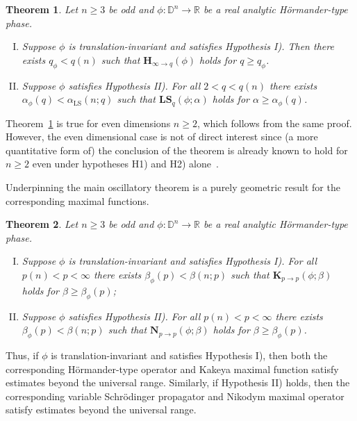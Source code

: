 \documentclass[reqno]{amsart}
\numberwithin{equation}{section}
\newcommand{\D}{\mathbb{D}}
\newcommand{\R}{\mathbb{R}}
\newcommand{\bH}{\mathbf{H}}
\newcommand{\bK}{\mathbf{K}}
\newcommand{\bN}{\mathbf{N}}
\newcommand{\bLS}{\mathbf{LS}}
\theoremstyle{plain}
\newtheorem{theorem}{Theorem}[section]
\theoremstyle{definition}
\begin{document}
\begin{theorem}\label{thm: osc improve}  Let $n \geq 3$ be odd and $\phi \colon \D^n \to \R$ be a real analytic H\"ormander-type phase. 
\begin{enumerate}[I)]
    \item Suppose $\phi$ is translation-invariant and satisfies Hypothesis I). Then there exists $q_{\phi} < q(n)$ such that $\bH_{\infty \to q}(\phi)$ holds for $q \geq q_{\phi}$.
    \item Suppose $\phi$ satisfies Hypothesis II). For all $2 < q < q(n)$ there exists $\alpha_{\phi}(q) < \alpha_{\mathrm{LS}}(n;q)$ such that $\bLS_q(\phi; \alpha)$ holds for $\alpha \geq \alpha_{\phi}(q)$. 
\end{enumerate}
\end{theorem}

Theorem~\ref{thm: osc improve} is true for even dimensions $n \geq 2$, which follows from the same proof. However, the even dimensional case is not of direct interest since (a more quantitative form of) the conclusion of the theorem is already known to hold for $n \geq 2$ even under hypotheses H1) and H2) alone~\cite{BG2011}. 


 Underpinning the main oscillatory theorem is a purely geometric result for the corresponding maximal functions. 

\begin{theorem}\label{thm: geom improve} Let $n \geq 3$ be odd and $\phi \colon \D^n \to \R$ be a real analytic H\"ormander-type phase. 
\begin{enumerate}[I)]
    \item Suppose $\phi$ is translation-invariant and satisfies Hypothesis I). For all $p(n) < p < \infty$ there exists $\beta_{\phi}(p) < \beta(n; p)$ such that $\bK_{p \to p}(\phi; \beta)$ holds for $\beta \geq \beta_{\phi}(p)$;
    \item Suppose $\phi$ satisfies Hypothesis II). For all $p(n) < p < \infty$ there exists $\beta_{\phi}(p) < \beta(n; p)$ such that $\bN_{p \to p}(\phi; \beta)$ holds for $\beta \geq \beta_{\phi}(p)$.
\end{enumerate}
\end{theorem}

Thus, if $\phi$ is translation-invariant and satisfies Hypothesis I), then both the corresponding H\"ormander-type operator and Kakeya maximal function satisfy estimates beyond the universal range. Similarly, if Hypothesis II) holds, then the corresponding variable Schr\"odinger propagator and Nikodym maximal operator satisfy estimates beyond the universal range.
\end{document}
